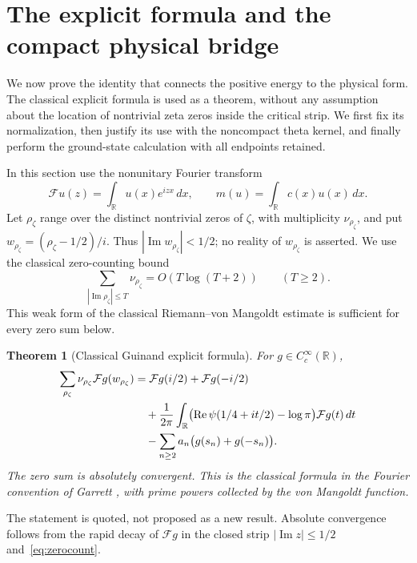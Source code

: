 \documentclass[11pt,a4paper]{article}
\numberwithin{equation}{section}
\newtheorem{theorem}{Theorem}[section]
\theoremstyle{remark}
\newcommand{\R}{\mathbb R}
\begin{document}
\section{The explicit formula and the compact physical bridge}\label{sec:bridge}

We now prove the identity that connects the positive energy to the physical form. The classical explicit formula is used as a theorem, without any assumption about the location of nontrivial zeta zeros inside the critical strip. We first fix its normalization, then justify its use with the noncompact theta kernel, and finally perform the ground-state calculation with all endpoints retained.

In this section use the nonunitary Fourier transform
\[
 \mathcal Fu(z)=\int_\R u(x)e^{izx}\,dx,
 \qquad m(u)=\int_\R c(x)u(x)\,dx.
\]
Let $\rho_\zeta$ range over the distinct nontrivial zeros of $\zeta$, with multiplicity $\nu_{\rho_\zeta}$, and put $w_{\rho_\zeta}=(\rho_\zeta-1/2)/i$. Thus $|\operatorname{Im}w_{\rho_\zeta}|<1/2$; no reality of $w_{\rho_\zeta}$ is asserted. We use the classical zero-counting bound
\begin{equation}\label{eq:zerocount}
 \sum_{|\operatorname{Im}\rho_\zeta|\le T}\nu_{\rho_\zeta}
       =O(T\log(T+2))\qquad(T\ge2).
\end{equation}
This weak form of the classical Riemann--von Mangoldt estimate \cite[Theorem~0.1]{GarrettZeros} is sufficient for every zero sum below.

\begin{theorem}[Classical Guinand explicit formula]\label{thm:guinand}
For $g\in C_c^\infty(\R)$,
\begin{align}\label{eq:guinand}
 \sum_{\rho_\zeta}\nu_{\rho_\zeta}\mathcal Fg(w_{\rho_\zeta})
 &=\mathcal Fg(i/2)+\mathcal Fg(-i/2)\notag\\
 &\quad+\frac1{2\pi}\int_\R
   \bigl(\operatorname{Re}\psi(1/4+it/2)-\log\pi\bigr)
       \mathcal Fg(t)\,dt\notag\\
 &\quad-\sum_{n\ge2}a_n\bigl(g(s_n)+g(-s_n)\bigr).
\end{align}
The zero sum is absolutely convergent. This is the classical formula in the Fourier convention of Garrett \cite[Theorem~0.1]{Garrett}, with prime powers collected by the von Mangoldt function.
\end{theorem}

The statement is quoted, not proposed as a new result. Absolute convergence follows from the rapid decay of $\mathcal Fg$ in the closed strip $|\operatorname{Im}z|\le1/2$ and~\eqref{eq:zerocount}.
\end{document}
